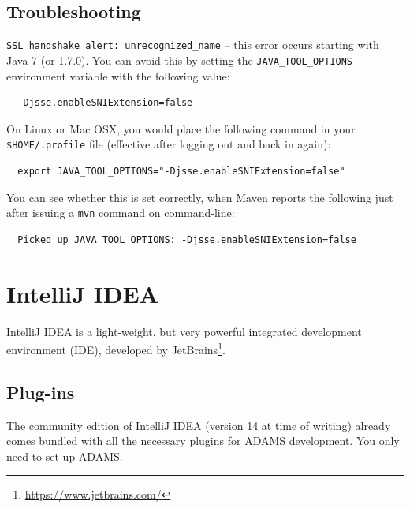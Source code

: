 \subsection{Troubleshooting}
\begin{tight_itemize}
  \item \texttt{SSL handshake alert: unrecognized\_name} -- this error occurs starting with Java 7 (or 1.7.0). You can avoid this by setting the \texttt{JAVA\_TOOL\_OPTIONS} environment variable with the following value:
  \begin{verbatim}
  -Djsse.enableSNIExtension=false
  \end{verbatim}
  On Linux or Mac OSX, you would place the following command in your \texttt{\$HOME/.profile} file (effective after logging out and back in again):
  \begin{verbatim}
  export JAVA_TOOL_OPTIONS="-Djsse.enableSNIExtension=false"
  \end{verbatim}
  You can see whether this is set correctly, when Maven reports the following just after issuing a \texttt{mvn} command on command-line:
  \begin{verbatim}
  Picked up JAVA_TOOL_OPTIONS: -Djsse.enableSNIExtension=false
  \end{verbatim}
\end{tight_itemize}

\clearpage
\section{IntelliJ IDEA}
IntelliJ IDEA\cite{intellij} is a light-weight, but very powerful integrated
development environment (IDE), developed by JetBrains\footnote{\url{https://www.jetbrains.com/}{}}.

\subsection{Plug-ins}
The community edition of IntelliJ IDEA (version 14 at time of writing) already
comes bundled with all the necessary plugins for ADAMS development. You only
need to set up ADAMS.

